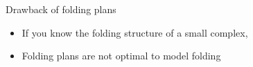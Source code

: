 \begin{frame}{Drawback of folding plans}
    \begin{itemize}
        \item<7->[$\Rightarrow$]If you know the folding structure of a small complex,
        \item<9->[$\leadsto$]Folding plans are not optimal to model folding
    \end{itemize}
\end{frame}



